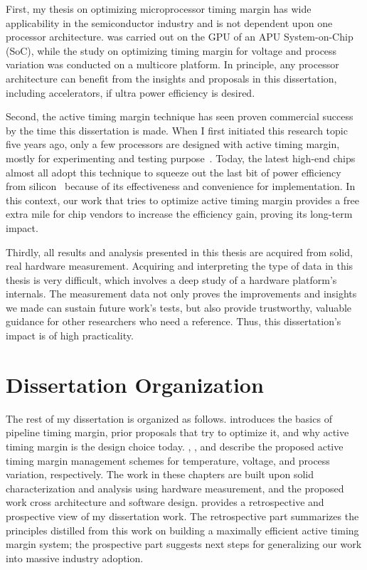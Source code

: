 First, my thesis on optimizing microprocessor timing margin has wide applicability in the semiconductor industry and is not dependent upon one processor architecture. \tistates was carried out on the GPU of an APU System-on-Chip (SoC), while the study on optimizing timing margin for voltage and process variation was conducted on a multicore platform. In principle, any processor architecture can benefit from the insights and proposals in this dissertation, including accelerators, if ultra power efficiency is desired. 

Second, the active timing margin technique has seen proven commercial success by the time this dissertation is made. When I first initiated this research topic five years ago, only a few processors are designed with active timing margin, mostly for experimenting and testing purpose~\cite{lefurgy2011active, bowman201222nm}. Today, the latest high-end chips almost all adopt this technique to squeeze out the last bit of power efficiency from silicon~\cite{tokunaga20145,grenat20145,bowman20158,webel2015robust,vezyrtzis2018droop} because of its effectiveness and convenience for implementation. In this context, our work that tries to optimize active timing margin provides a free extra mile for chip vendors to increase the efficiency gain, proving its long-term impact.

Thirdly, all results and analysis presented in this thesis are acquired from solid, real hardware measurement. Acquiring and interpreting the type of data in this thesis is very difficult, which involves a deep study of a hardware platform's internals. The measurement data not only proves the improvements and insights we made can sustain future work's tests, but also provide trustworthy, valuable guidance for other researchers who need a reference. Thus, this dissertation's impact is of high practicality.


\section{Dissertation Organization}
\label{sec:intro:outline}

The rest of my dissertation is organized as follows. 
 introduces the basics of pipeline timing margin, prior proposals that try to optimize it, and why active timing margin is the design choice today. 
, , and  describe the proposed active timing margin management schemes for temperature, voltage, and process variation, respectively. The work in these chapters are built upon solid characterization and analysis using hardware measurement, and the proposed work cross architecture and software design.  provides a retrospective and prospective view of my dissertation work. The retrospective part summarizes the principles distilled from this work on building a maximally efficient active timing margin system; the prospective part suggests next steps for generalizing our work into massive industry adoption.

